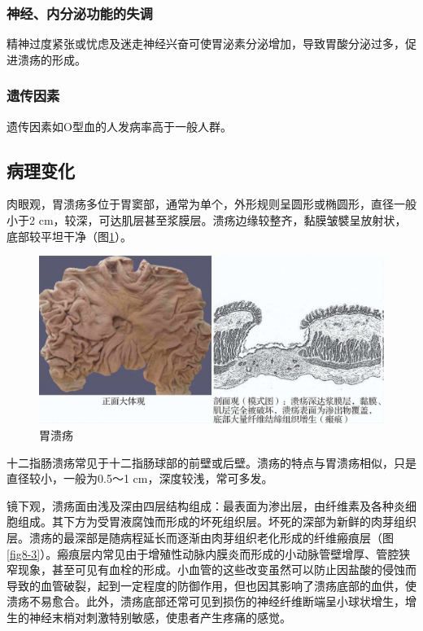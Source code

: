 \subsubsection{神经、内分泌功能的失调}

精神过度紧张或忧虑及迷走神经兴奋可使胃泌素分泌增加，导致胃酸分泌过多，促进溃疡的形成。

\subsubsection{遗传因素}

遗传因素如O型血的人发病率高于一般人群。

\subsection{病理变化}

肉眼观，胃溃疡多位于胃窦部，通常为单个，外形规则呈圆形或椭圆形，直径一般小于2
cm，较深，可达肌层甚至浆膜层。溃疡边缘较整齐，黏膜皱襞呈放射状，底部较平坦干净（图\ref{fig8-2}）。

\begin{figure}[!htbp]
 \centering
 \includegraphics{./images/Image00127.jpg}
 \captionsetup{justification=centering}
 \caption{胃溃疡}
 \label{fig8-2}
  \end{figure} 

十二指肠溃疡常见于十二指肠球部的前壁或后壁。溃疡的特点与胃溃疡相似，只是直径较小，一般为0.5～1
cm，深度较浅，常可多发。

镜下观，溃疡面由浅及深由四层结构组成：最表面为渗出层，由纤维素及各种炎细胞组成。其下方为受胃液腐蚀而形成的坏死组织层。坏死的深部为新鲜的肉芽组织层。溃疡的最深部是随病程延长而逐渐由肉芽组织老化形成的纤维瘢痕层（图\ref{fig8-3}）。瘢痕层内常见由于增殖性动脉内膜炎而形成的小动脉管壁增厚、管腔狭窄现象，甚至可见有血栓的形成。小血管的这些改变虽然可以防止因盐酸的侵蚀而导致的血管破裂，起到一定程度的防御作用，但也因其影响了溃疡底部的血供，使溃疡不易愈合。此外，溃疡底部还常可见到损伤的神经纤维断端呈小球状增生，增生的神经末梢对刺激特别敏感，使患者产生疼痛的感觉。

